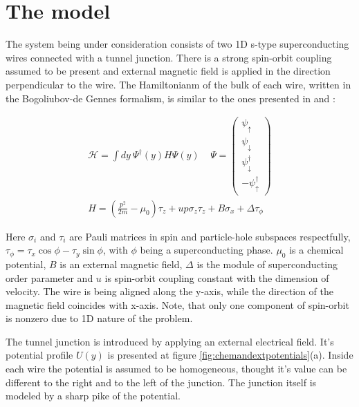 \newcommand{\xbr}{\left(x\right)}
\newcommand{\br}[1]{\left(#1\right)}


\chapter{The model}

The system being under consideration consists of two 1D s-type superconducting wires connected with a tunnel junction. There is a strong spin-orbit coupling assumed to be present and external magnetic field is applied in the direction perpendicular to the wire. The Hamiltonianm of the bulk of each wire, written in the Bogoliubov-de Gennes formalism, is similar to the ones presented in \cite{Oreg_2010} and \cite{Lutchyn_2010}:

\begin{gather}
	\mathcal{H}
	=
	\int dy ~
	\Psi^\dagger
	\br{y}
	H
	\Psi
	\br{y}
	\
	~~~~
	\Psi
	=
	\begin{pmatrix}
		\psi_\uparrow
		\\
		\psi_\downarrow
		\\
		\psi_\downarrow^\dagger
		\\
		-\psi_\uparrow^\dagger
	\end{pmatrix}
	\\
	\label{bulk_Hamiltonian}
	H
	=
	\br{
		\frac{p^2}{2m}
		-\mu_0
	}\tau_z
	+
	u p \sigma_z \tau_z
	+
	B\sigma_x	
	+
	\Delta\tau_\phi
\end{gather}

Here $ \sigma_i $ and $ \tau_i $ are Pauli matrices in spin and particle-hole subspaces respectfully, $ \tau_\phi = \tau_x \cos\phi - \tau_y \sin\phi$, with $ \phi $ being a superconducting phase. $ \mu_0 $ is a chemical potential, $ B $ is an external magnetic field, $ \Delta $ is the module of superconducting order parameter and $ u $ is spin-orbit coupling constant with the dimension of velocity. The wire is being aligned along the y-axis, while the direction of the magnetic field coincides with x-axis. Note, that only one component of spin-orbit is nonzero due to 1D nature of the problem.

The tunnel junction is introduced  by applying an external electrical field. It's potential profile $U\br{y}  $ is presented at figure \ref{fig:chemandextpotentials}(a). Inside each wire the potential is assumed to be homogeneous, thought it's value can be different to the right and to the left of the junction. The junction itself is modeled by a sharp pike of the potential.
 
